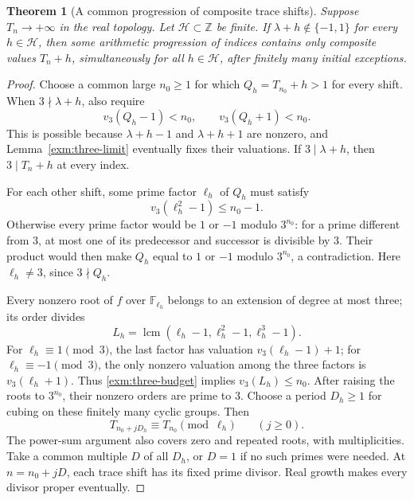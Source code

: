 \documentclass[11pt,a4paper]{article}
\numberwithin{equation}{section}
\newtheorem{theorem}{Theorem}[section]
\theoremstyle{definition}
\theoremstyle{remark}
\begin{document}
\begin{theorem}[A common progression of composite trace shifts]
\label{exm:windows}
Suppose \(T_n\to+\infty\) in the real topology. Let
\(\mathcal H\subset\mathbb Z\) be finite. If
\(\lambda+h\notin\{-1,1\}\) for every \(h\in\mathcal H\),
then some arithmetic progression of indices contains only
composite values \(T_n+h\), simultaneously for all
\(h\in\mathcal H\), after finitely many initial exceptions.
\end{theorem}
\begin{proof}
Choose a common large \(n_0\ge1\) for which
\(Q_h=T_{n_0}+h>1\) for every shift. When
\(3\nmid\lambda+h\), also require
\[
 v_3(Q_h-1)<n_0,\qquad v_3(Q_h+1)<n_0.
\]
This is possible because \(\lambda+h-1\) and
\(\lambda+h+1\) are nonzero, and
Lemma~\ref{exm:three-limit} eventually fixes their valuations.
If \(3\mid\lambda+h\), then \(3\mid T_n+h\) at every index.

For each other shift, some prime factor \(\ell_h\) of \(Q_h\)
must satisfy
\begin{equation}\label{exm:three-budget}
 v_3(\ell_h^2-1)\le n_0-1.
\end{equation}
Otherwise every prime factor would be \(1\) or \(-1\)
modulo \(3^{n_0}\): for a prime different from \(3\),
at most one of its predecessor and successor is divisible
by \(3\). Their product would then make \(Q_h\) equal
to \(1\) or \(-1\) modulo \(3^{n_0}\), a contradiction.
Here \(\ell_h\ne3\), since \(3\nmid Q_h\).

Every nonzero root of \(f\) over \(\mathbb F_{\ell_h}\)
belongs to an extension of degree at most three; its order
divides
\[
 L_h=\operatorname{lcm}(\ell_h-1,\ell_h^2-1,\ell_h^3-1).
\]
For \(\ell_h\equiv1\pmod3\), the last factor has
valuation \(v_3(\ell_h-1)+1\); for
\(\ell_h\equiv-1\pmod3\), the only nonzero valuation among
the three factors is \(v_3(\ell_h+1)\).
Thus \eqref{exm:three-budget} implies \(v_3(L_h)\le n_0\).
After raising the roots to \(3^{n_0}\), their nonzero
orders are prime to \(3\). Choose a period \(D_h\ge1\)
for cubing on these finitely many cyclic groups. Then
\[
 T_{n_0+jD_h}\equiv T_{n_0}\pmod{\ell_h}\qquad(j\ge0).
\]
The power-sum argument also covers zero and repeated roots,
with multiplicities.
Take a common multiple \(D\) of all \(D_h\), or \(D=1\)
if no such primes were needed. At \(n=n_0+jD\), each
trace shift has its fixed prime divisor. Real growth makes
every divisor proper eventually.
\end{proof}
\end{document}

